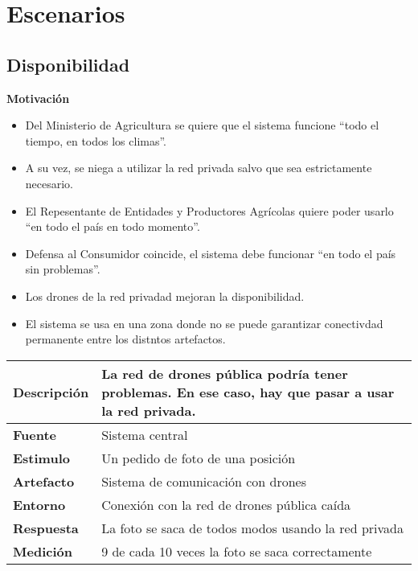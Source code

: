 \section{Escenarios}
\subsection{Disponibilidad}
\textbf{Motivación}
\begin{itemize}
 \item Del Ministerio de Agricultura se quiere que el sistema funcione ``todo el tiempo, en todos los climas''.
 \item A su vez, se niega a utilizar la red privada salvo que sea estrictamente necesario.
 \item El Repesentante de Entidades y Productores Agrícolas quiere poder usarlo ``en todo el país en todo momento''.
 \item Defensa al Consumidor coincide, el sistema debe funcionar ``en todo el país sin problemas''.
 \item Los drones de la red privadad mejoran la disponibilidad.
 \item El sistema se usa en una zona donde no se puede garantizar conectivdad permanente entre los distntos artefactos.
\end{itemize}


\begin{tabular}{| l || p{12cm} |}
\hline 
\textbf{Descripci\'on} & La red de drones pública podría tener problemas. En ese caso, hay que pasar a usar la red privada. \\
\hline 
\textbf{Fuente} & Sistema central \\
\hline 
\textbf{Estimulo} & Un pedido de foto de una posición \\
\hline 
\textbf{Artefacto} & Sistema de comunicación con drones \\
\hline 
\textbf{Entorno} & Conexión con la red de drones pública caída \\
\hline 
\textbf{Respuesta} & La foto se saca de todos modos usando la red privada \\
\hline 
\textbf{Medici\'on} & 9 de cada 10 veces la foto se saca correctamente \\
\hline 
\end{tabular}

\medskip


